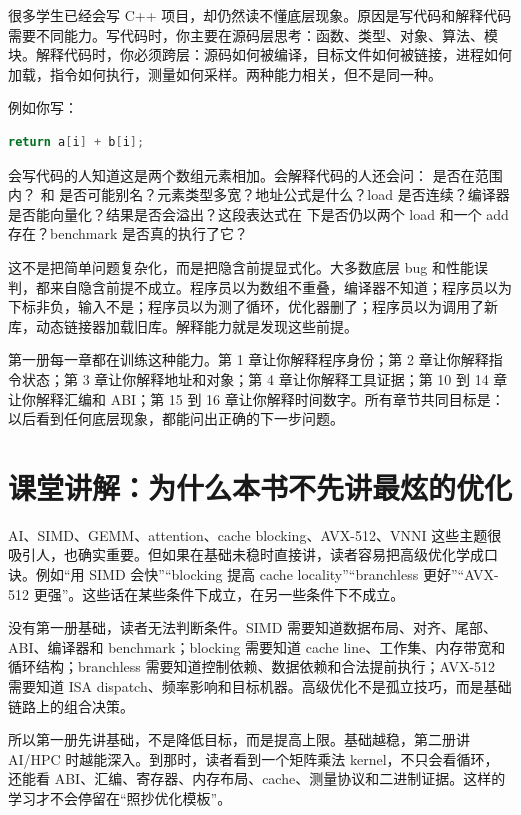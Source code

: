 很多学生已经会写 C++ 项目，却仍然读不懂底层现象。原因是写代码和解释代码需要不同能力。写代码时，你主要在源码层思考：函数、类型、对象、算法、模块。解释代码时，你必须跨层：源码如何被编译，目标文件如何被链接，进程如何加载，指令如何执行，测量如何采样。两种能力相关，但不是同一种。

例如你写：

\begin{lstlisting}[language=C++]
return a[i] + b[i];
\end{lstlisting}

会写代码的人知道这是两个数组元素相加。会解释代码的人还会问： 是否在范围内？ 和  是否可能别名？元素类型多宽？地址公式是什么？load 是否连续？编译器是否能向量化？结果是否会溢出？这段表达式在  下是否仍以两个 load 和一个 add 存在？benchmark 是否真的执行了它？

这不是把简单问题复杂化，而是把隐含前提显式化。大多数底层 bug 和性能误判，都来自隐含前提不成立。程序员以为数组不重叠，编译器不知道；程序员以为下标非负，输入不是；程序员以为测了循环，优化器删了；程序员以为调用了新库，动态链接器加载旧库。解释能力就是发现这些前提。

第一册每一章都在训练这种能力。第 1 章让你解释程序身份；第 2 章让你解释指令状态；第 3 章让你解释地址和对象；第 4 章让你解释工具证据；第 10 到 14 章让你解释汇编和 ABI；第 15 到 16 章让你解释时间数字。所有章节共同目标是：以后看到任何底层现象，都能问出正确的下一步问题。

\section{课堂讲解：为什么本书不先讲最炫的优化}

AI、SIMD、GEMM、attention、cache blocking、AVX-512、VNNI 这些主题很吸引人，也确实重要。但如果在基础未稳时直接讲，读者容易把高级优化学成口诀。例如“用 SIMD 会快”“blocking 提高 cache locality”“branchless 更好”“AVX-512 更强”。这些话在某些条件下成立，在另一些条件下不成立。

没有第一册基础，读者无法判断条件。SIMD 需要知道数据布局、对齐、尾部、ABI、编译器和 benchmark；blocking 需要知道 cache line、工作集、内存带宽和循环结构；branchless 需要知道控制依赖、数据依赖和合法提前执行；AVX-512 需要知道 ISA dispatch、频率影响和目标机器。高级优化不是孤立技巧，而是基础链路上的组合决策。

所以第一册先讲基础，不是降低目标，而是提高上限。基础越稳，第二册讲 AI/HPC 时越能深入。到那时，读者看到一个矩阵乘法 kernel，不只会看循环，还能看 ABI、汇编、寄存器、内存布局、cache、测量协议和二进制证据。这样的学习才不会停留在“照抄优化模板”。

